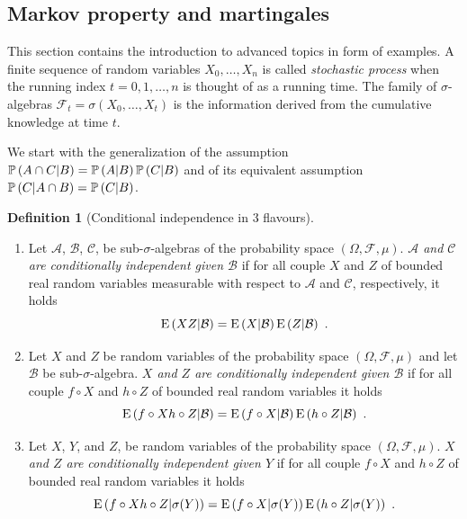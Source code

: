 \documentclass[12pt,a4paper]{amsart}
\theoremstyle{plain}%
\theoremstyle{definition}
\newtheorem{definition}{Definition}%
\theoremstyle{remark}
\begin{document}
\subsection{Markov property and martingales}
\label{sec:markov}

This section contains the introduction to advanced topics in form of
examples. A finite sequence of random variables $X_0, \dots, X_n$ is
called \emph{stochastic process} when the running index $t =
0,1,\dots,n$ is thought of as a running time. The family of
$\sigma$-algebras $\mathcal F_t = \sigma(X_0,\dots,X_t)$ is the
information derived from the cumulative knowledge at time $t$.

We start with the generalization of the assumption $\operatorname{\mathbb P}\left(A \cap C | B\right) =
\operatorname{\mathbb P}\left(A|B\right) \operatorname{\mathbb P}\left(C|B\right)$ and of its equivalent assumption $\operatorname{\mathbb P}\left(C|A
  \cap B\right) = \operatorname{\mathbb P}\left(C|B\right)$.

\begin{definition}[Conditional independence in 3 flavours] \ 
  \begin{enumerate}
    \item Let $\mathcal A$,
  $\mathcal B$, $\mathcal C$, be sub-$\sigma$-algebras of the
  probability space $(\Omega,\mathcal F, \mu)$. \emph{$\mathcal A$ and
  $\mathcal C$ are conditionally independent given $\mathcal B$} if
  for all couple $X$ and $Z$ of bounded real random variables measurable
  with respect to $\mathcal A$ and $\mathcal C$, respectively,
  it holds
    \begin{equation*}
      \operatorname{E}\left(XZ \middle| \mathcal B\right) = \operatorname{E}\left(X \middle| \mathcal
        B\right)\operatorname{E}\left(Z \middle| \mathcal B\right) \ .
    \end{equation*}
  \item Let $X$ and $Z$ be random variables of the probability space
    $(\Omega,\mathcal F, \mu)$ and let $\mathcal B$ be
    sub-$\sigma$-algebra. \emph{$X$ and $Z$ are conditionally
      independent given $\mathcal B$} if for all couple $f\circ X$ and
    $h \circ Z$ of bounded real random variables it holds
    \begin{equation*}
      \condexp{f \circ X h \circ Z}{\mathcal B} = \condexp{f \circ
        X}{\mathcal B}\condexp{h \circ Z}{\mathcal B} \ .
    \end{equation*}
  \item Let $X$, $Y$, and $Z$, be random variables of the probability space
    $(\Omega,\mathcal F, \mu)$. \emph{$X$ and $Z$ are conditionally
      independent given $Y$} if for all couple $f\circ X$ and
    $h \circ Z$ of bounded real random variables it holds
    \begin{equation*}
      \condexp{f \circ X h \circ Z}{\sigma(Y)} = \condexp{f \circ
        X}{\sigma(Y)}\condexp{h \circ Z}{\sigma(Y)} \ .
    \end{equation*}
  \end{enumerate}
\end{definition}
\end{document}
